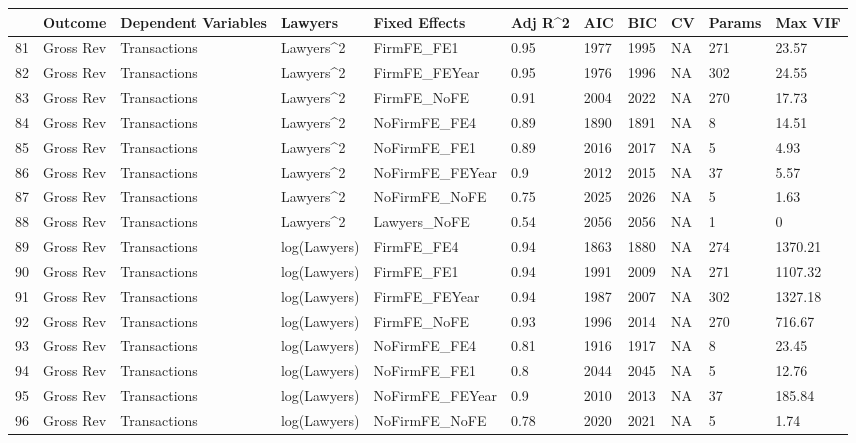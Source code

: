 \documentclass{article}
\begin{document}
\begin{table}[H]
\centering
\begin{tabular}{rllllllllll}
  \hline
 & Outcome & Dependent Variables & Lawyers & Fixed Effects & Adj R^2 & AIC & BIC & CV & Params & Max VIF \\ 
  \hline
81 & Gross Rev & Transactions & Lawyers^2 & FirmFE\_FE1 & 0.95 & 1977 & 1995 & NA & 271 & 23.57 \\ 
  82 & Gross Rev & Transactions & Lawyers^2 & FirmFE\_FEYear & 0.95 & 1976 & 1996 & NA & 302 & 24.55 \\ 
  83 & Gross Rev & Transactions & Lawyers^2 & FirmFE\_NoFE & 0.91 & 2004 & 2022 & NA & 270 & 17.73 \\ 
  84 & Gross Rev & Transactions & Lawyers^2 & NoFirmFE\_FE4 & 0.89 & 1890 & 1891 & NA & 8 & 14.51 \\ 
  85 & Gross Rev & Transactions & Lawyers^2 & NoFirmFE\_FE1 & 0.89 & 2016 & 2017 & NA & 5 & 4.93 \\ 
  86 & Gross Rev & Transactions & Lawyers^2 & NoFirmFE\_FEYear & 0.9 & 2012 & 2015 & NA & 37 & 5.57 \\ 
  87 & Gross Rev & Transactions & Lawyers^2 & NoFirmFE\_NoFE & 0.75 & 2025 & 2026 & NA & 5 & 1.63 \\ 
  88 & Gross Rev & Transactions & Lawyers^2 & Lawyers\_NoFE & 0.54 & 2056 & 2056 & NA & 1 & 0 \\ 
  89 & Gross Rev & Transactions & log(Lawyers) & FirmFE\_FE4 & 0.94 & 1863 & 1880 & NA & 274 & 1370.21 \\ 
  90 & Gross Rev & Transactions & log(Lawyers) & FirmFE\_FE1 & 0.94 & 1991 & 2009 & NA & 271 & 1107.32 \\ 
  91 & Gross Rev & Transactions & log(Lawyers) & FirmFE\_FEYear & 0.94 & 1987 & 2007 & NA & 302 & 1327.18 \\ 
  92 & Gross Rev & Transactions & log(Lawyers) & FirmFE\_NoFE & 0.93 & 1996 & 2014 & NA & 270 & 716.67 \\ 
  93 & Gross Rev & Transactions & log(Lawyers) & NoFirmFE\_FE4 & 0.81 & 1916 & 1917 & NA & 8 & 23.45 \\ 
  94 & Gross Rev & Transactions & log(Lawyers) & NoFirmFE\_FE1 & 0.8 & 2044 & 2045 & NA & 5 & 12.76 \\ 
  95 & Gross Rev & Transactions & log(Lawyers) & NoFirmFE\_FEYear & 0.9 & 2010 & 2013 & NA & 37 & 185.84 \\ 
  96 & Gross Rev & Transactions & log(Lawyers) & NoFirmFE\_NoFE & 0.78 & 2020 & 2021 & NA & 5 & 1.74 \\ 

\end{tabular}
\end{table}
\end{document}
